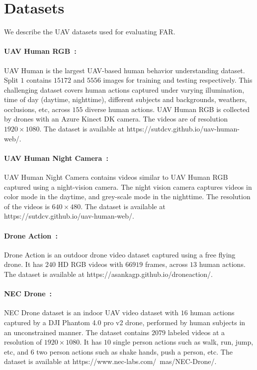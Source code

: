\documentclass[runningheads]{llncs}
\begin{document}
\section{Datasets}

We describe the UAV datasets used for evaluating FAR. 

\paragraph{UAV Human RGB~\cite{li2021uav}:} UAV Human is the largest UAV-based human behavior understanding dataset. Split $1$ contains $15172$ and $5556$ images for training and testing respectively. This challenging dataset covers human actions captured under varying illumination, time of day (daytime, nighttime), different subjects and backgrounds, weathers, occlusions, etc, across $155$ diverse human actions. UAV Human RGB is collected by drones with an Azure Kinect DK camera. The videos are of resolution $1920\times1080$. The dataset is available at  https://sutdcv.github.io/uav-human-web/. 

\paragraph{UAV Human Night Camera~\cite{li2021uav}:} UAV Human Night Camera contains videos similar to UAV Human RGB captured using a night-vision camera. The night vision camera captures videos in color mode in the daytime, and grey-scale mode in the nighttime. The resolution of the videos is $640\times480$. The dataset is available at  https://sutdcv.github.io/uav-human-web/. 


\paragraph{Drone Action~\cite{perera2019drone}:} Drone Action is an outdoor drone video dataset captured using a free flying drone. It has $240$ HD RGB videos with $66919$ frames, across $13$ human actions. The dataset is available at https://asankagp.github.io/droneaction/.

\paragraph{NEC Drone~\cite{choi2020unsupervised}:} NEC Drone dataset is an indoor UAV video dataset with $16$ human actions captured by a DJI Phantom 4.0 pro v2 drone, performed by human subjects in an unconstrained manner. The dataset contains $2079$ labeled videos at a resolution of $1920\times1080$. It has $10$ single person actions such as walk, run, jump, etc, and $6$ two person actions such as shake hands, push a person, etc. The dataset is available at https://www.nec-labs.com/~mas/NEC-Drone/. 
\end{document}
